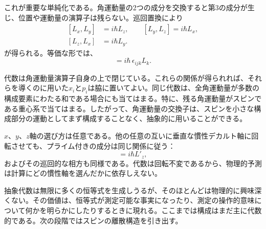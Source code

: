 これが重要な単純化である。角運動量の2つの成分を交換すると第3の成分が生じ、位置や運動量の演算子は残らない。巡回置換により
\begin{equation}
\begin{aligned}
[L_x,L_y]&=i\hbar L_z,\qquad
[L_y,L_z]=i\hbar L_x,\\
[L_z,L_x]&=i\hbar L_y.
\end{aligned}
\end{equation}
が得られる。等価な形では、
\begin{equation}
[L_i,L_j]=i\hbar\,\epsilon_{ijk}L_k.
\end{equation}

代数は角運動量演算子自身の上で閉じている。これらの関係が得られれば、それらを導くのに用いた\(x_i\)と\(p_i\)は脇に置いてよい。同じ代数は、全角運動量が多数の構成要素にわたる和である場合にも当てはまる。特に、残る角運動量がスピンである重心系で当てはまる。したがって、角運動量の交換子は、スピンを小さな構成部分の運動としてまず構成することなく、抽象的に用いることができる。

\(x\)、\(y\)、\(z\)軸の選び方は任意である。他の任意の互いに垂直な慣性デカルト軸に回転させても、プライム付きの成分は同じ関係に従う：
\begin{equation}
[L'_x,L'_y]=i\hbar L'_z,
\end{equation}
およびその巡回的な相方も同様である。代数は回転不変であるから、物理的予測は計算にどの慣性軸を選んだかに依存しえない。

\begin{classroomqa}
\end{classroomqa}

抽象代数は無限に多くの恒等式を生成しうるが、そのほとんどは物理的に興味深くない。その価値は、恒等式が測定可能な事実になったり、測定の操作的意味について何かを明らかにしたりするときに現れる。ここまでは構成はまだ主に代数的である。次の段階ではスピンの離散構造を引き出す。

\begin{classroomqa}
\end{classroomqa}

